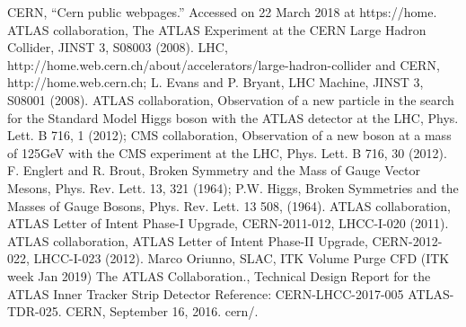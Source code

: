 \documentclass[a4paper]{jpconf}
\begin{document}
\clearpage
%
%
\begin{thebibliography}{99}
  CERN, “Cern public webpages.” Accessed on 22 March 2018 at https://home.
 ATLAS collaboration, The ATLAS Experiment at the CERN Large Hadron Collider, JINST 3, S08003 (2008).
 LHC, http://home.web.cern.ch/about/accelerators/large-hadron-collider and CERN, http://home.web.cern.ch; L. Evans and P. Bryant, LHC Machine, JINST 3, S08001 (2008).
 ATLAS collaboration, Observation of a new particle in the search for the Standard Model Higgs
boson with the ATLAS detector at the LHC, Phys. Lett. B 716, 1 (2012); CMS collaboration, Observation of a new boson at a mass of 125GeV with the CMS experiment at the LHC, Phys. Lett. B 716, 30 (2012).
 F. Englert and R. Brout, Broken Symmetry and the Mass of Gauge Vector Mesons,
Phys. Rev. Lett. 13, 321 (1964); P.W. Higgs, Broken Symmetries and the Masses of Gauge Bosons, Phys. Rev. Lett. 13 508, (1964).
 ATLAS collaboration, ATLAS Letter of Intent Phase-I Upgrade, CERN-2011-012, LHCC-I-020 (2011).
 ATLAS collaboration, ATLAS Letter of Intent Phase-II Upgrade, CERN-2012-022, LHCC-I-023 (2012).
 Marco Oriunno, SLAC, ITK Volume Purge CFD  (ITK week Jan 2019)
 The ATLAS Collaboration., Technical Design Report for the ATLAS Inner Tracker Strip Detector
               Reference: CERN-LHCC-2017-005 ATLAS-TDR-025. CERN, September 16, 2016. cern/.
\end{thebibliography}
\end{document}
